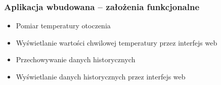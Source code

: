 \documentclass[dvipsnames,table]{beamer}
\begin{document}
\begin{frame}
\frametitle{Aplikacja wbudowana -- założenia funkcjonalne}
\begin{itemize}
	\item Pomiar temperatury otoczenia
	\item Wyświetlanie wartości chwilowej temperatury przez interfejs web
	\item Przechowywanie danych historycznych
	\item Wyświetlanie danych historycznych przez interfejs web
\end{itemize}
\end{frame}

\end{document}
